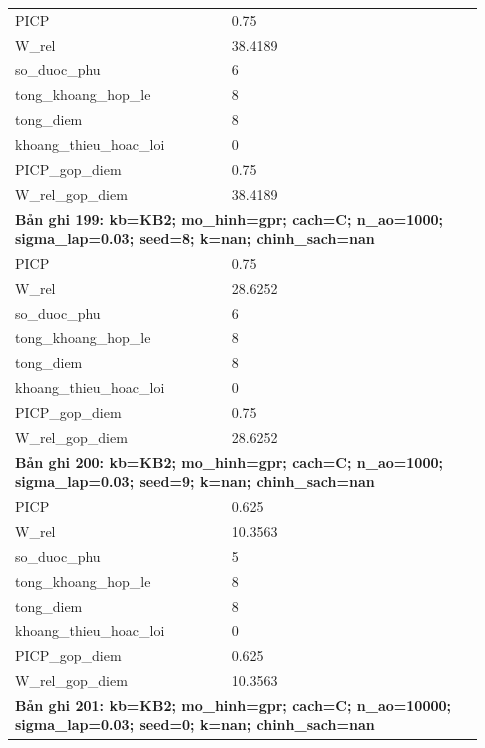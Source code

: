 \begin{longtable}{p{0.43\linewidth}p{0.50\linewidth}}
PICP & 0.75 \\
W\_\allowbreak rel & 38.4189 \\
so\_\allowbreak duoc\_\allowbreak phu & 6 \\
tong\_\allowbreak khoang\_\allowbreak hop\_\allowbreak le & 8 \\
tong\_\allowbreak diem & 8 \\
khoang\_\allowbreak thieu\_\allowbreak hoac\_\allowbreak loi & 0 \\
PICP\_\allowbreak gop\_\allowbreak diem & 0.75 \\
W\_\allowbreak rel\_\allowbreak gop\_\allowbreak diem & 38.4189 \\
\midrule
\multicolumn{2}{p{0.95\linewidth}}{\textbf{Bản ghi 199: kb=KB2; mo\_hinh=gpr; cach=C; n\_ao=1000; sigma\_lap=0.03; seed=8; k=nan; chinh\_sach=nan}} \\
PICP & 0.75 \\
W\_\allowbreak rel & 28.6252 \\
so\_\allowbreak duoc\_\allowbreak phu & 6 \\
tong\_\allowbreak khoang\_\allowbreak hop\_\allowbreak le & 8 \\
tong\_\allowbreak diem & 8 \\
khoang\_\allowbreak thieu\_\allowbreak hoac\_\allowbreak loi & 0 \\
PICP\_\allowbreak gop\_\allowbreak diem & 0.75 \\
W\_\allowbreak rel\_\allowbreak gop\_\allowbreak diem & 28.6252 \\
\midrule
\multicolumn{2}{p{0.95\linewidth}}{\textbf{Bản ghi 200: kb=KB2; mo\_hinh=gpr; cach=C; n\_ao=1000; sigma\_lap=0.03; seed=9; k=nan; chinh\_sach=nan}} \\
PICP & 0.625 \\
W\_\allowbreak rel & 10.3563 \\
so\_\allowbreak duoc\_\allowbreak phu & 5 \\
tong\_\allowbreak khoang\_\allowbreak hop\_\allowbreak le & 8 \\
tong\_\allowbreak diem & 8 \\
khoang\_\allowbreak thieu\_\allowbreak hoac\_\allowbreak loi & 0 \\
PICP\_\allowbreak gop\_\allowbreak diem & 0.625 \\
W\_\allowbreak rel\_\allowbreak gop\_\allowbreak diem & 10.3563 \\
\midrule
\multicolumn{2}{p{0.95\linewidth}}{\textbf{Bản ghi 201: kb=KB2; mo\_hinh=gpr; cach=C; n\_ao=10000; sigma\_lap=0.03; seed=0; k=nan; chinh\_sach=nan}} \\

\end{longtable}
